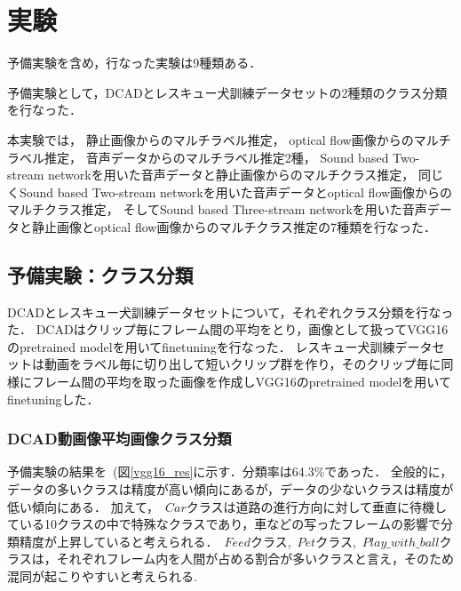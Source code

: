 \chapter{実験}
予備実験を含め，行なった実験は9種類ある．

予備実験として，DCADとレスキュー犬訓練データセットの2種類のクラス分類を行なった．

本実験では，
静止画像からのマルチラベル推定，
optical flow画像からのマルチラベル推定，
音声データからのマルチラベル推定2種，
Sound based Two-stream networkを用いた音声データと静止画像からのマルチクラス推定，
同じくSound based Two-stream networkを用いた音声データとoptical flow画像からのマルチクラス推定，
そしてSound based Three-stream networkを用いた音声データと静止画像とoptical flow画像からのマルチクラス推定の7種類を行なった．
\section{予備実験：クラス分類}
DCADとレスキュー犬訓練データセットについて，それぞれクラス分類を行なった．
DCADはクリップ毎にフレーム間の平均をとり，画像として扱ってVGG16のpretrained modelを用いてfinetuningを行なった．
レスキュー犬訓練データセットは動画をラベル毎に切り出して短いクリップ群を作り，そのクリップ毎に同様にフレーム間の平均を取った画像を作成しVGG16のpretrained modelを用いてfinetuningした．
\subsection{DCAD動画像平均画像クラス分類}
予備実験の結果を~(図\ref{vgg16_res}に示す．分類率は64.3\%であった．
全般的に，データの多いクラスは精度が高い傾向にあるが，データの少ないクラスは精度が低い傾向にある．
加えて，~\(Car\)クラスは道路の進行方向に対して垂直に待機している10クラスの中で特殊なクラスであり，車などの写ったフレームの影響で分類精度が上昇していると考えられる．~\(Feed\)クラス,~\(Pet\)クラス,~\(Play\_with\_ball\)クラスは，それぞれフレーム内を人間が占める割合が多いクラスと言え，そのため混同が起こりやすいと考えられる.

